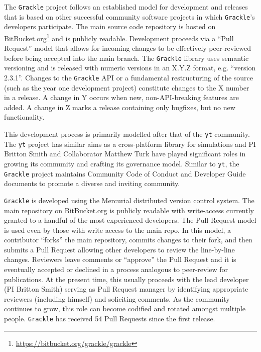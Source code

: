 \documentclass[11pt]{article}
\newcommand{\grackle}{\texttt{Grackle}}
\newcommand{\yt}{\texttt{yt}}
\begin{document}
\begin{flushleft}
The \grackle{} project follows an established model for development
and releases that is based on other successful community software
projects in which \grackle{}'s developers participate.  The main
source code repository is hosted on
BitBucket.org\footnote{\url{https://bitbucket.org/grackle/grackle}}
and is publicly readable.  Development proceeds via a ``Pull Request''
model that allows for incoming changes to be effectively peer-reviewed
before  being accepted into the main branch.  The \grackle{} library
uses semantic versioning and
is released with numeric versions in an X.Y.Z format, e.g. ``version
2.3.1''.  Changes to the \grackle{} API or a fundamental restructuring
of the source (such as the year one development project) constitute
changes to the X number in a release.  A change in Y occurs when new,
non-API-breaking features are added.  A change in Z marks a release
containing only bugfixes, but no new functionality.

This development process is primarily modelled after that
of the \yt{} community.  The \yt{} project has similar
aims as a cross-platform library for simulations and PI Britton Smith
and Collaborator Matthew Turk have played significant roles in growing
its community and crafting its governance model.  Similar to
\yt{}, the \grackle{} project maintains Community Code of
Conduct and Developer Guide documents to promote a diverse and
inviting community.

\grackle{} is developed using the Mercurial distributed version
control system.  The main repository on BitBucket.org is publicly
readable with write-access currently granted to a handful of the most
experienced developers.  The Pull Request model is used even by those
with write access to the main repo.  In this model, a contributor
``forks'' the main repository, commits changes to their fork, and then
submits a Pull Request allowing other developers to review the
line-by-line changes.  Reviewers leave comments or ``approve'' the
Pull Request and it is eventually accepted or declined in a process
analogous to peer-review for publications.  At the present time, this
usually proceeds with the lead developer (PI Britton Smith) serving as
Pull Request manager by identifying appropriate reviewers (including
himself) and soliciting comments.  As the community continues to grow,
this role can become codified and rotated amongst multiple people.
\grackle{} has received 54 Pull Requests since the first release.


\end{flushleft}
\end{document}

